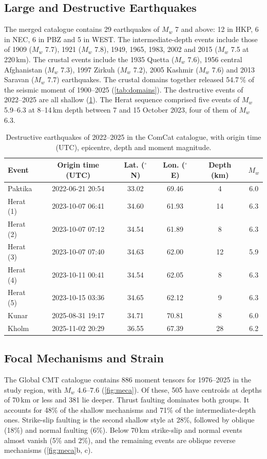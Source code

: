 \documentclass[11pt]{article}
\begin{document}
\subsection{Large and Destructive Earthquakes}
The merged catalogue contains 29 earthquakes of $M_w$ 7 and above: 12 in HKP, 6 in
NEC, 6 in PBZ and 5 in WEST. The intermediate-depth events include those of 1909
($M_w$ 7.7), 1921 ($M_w$ 7.8), 1949, 1965, 1983, 2002 and 2015 ($M_w$ 7.5 at
220\,km). The crustal events include the 1935 Quetta ($M_w$ 7.6), 1956 central
Afghanistan ($M_w$ 7.3), 1997 Zirkuh ($M_w$ 7.2), 2005 Kashmir ($M_w$ 7.6) and 2013
Saravan ($M_w$ 7.7) earthquakes. The crustal domains together released 54.7\,\% of
the seismic moment of 1900--2025 (\cref{tab:domains}). The destructive events of
2022--2025 are all shallow (\cref{tab:events}). The Herat sequence comprised five
events of $M_w$ 5.9--6.3 at 8--14\,km depth between 7 and 15 October 2023, four of
them of $M_w$ 6.3.

\begin{table}[htbp]\centering
  \caption{Destructive earthquakes of 2022--2025 in the ComCat catalogue, with
  origin time (UTC), epicentre, depth and moment magnitude.}
  \label{tab:events}
  \small
  \begin{tabular}{lccccc}
    \toprule
    Event & Origin time (UTC) & Lat. ($^\circ$N) & Lon. ($^\circ$E) & Depth (km) & $M_w$ \\
    \midrule
    Paktika & 2022-06-21 20:54 & 33.02 & 69.46 & 4 & 6.0 \\
    Herat (1) & 2023-10-07 06:41 & 34.60 & 61.93 & 14 & 6.3 \\
    Herat (2) & 2023-10-07 07:12 & 34.54 & 61.89 & 8 & 6.3 \\
    Herat (3) & 2023-10-07 07:40 & 34.63 & 62.00 & 12 & 5.9 \\
    Herat (4) & 2023-10-11 00:41 & 34.54 & 62.05 & 8 & 6.3 \\
    Herat (5) & 2023-10-15 03:36 & 34.65 & 62.12 & 9 & 6.3 \\
    Kunar & 2025-08-31 19:17 & 34.71 & 70.81 & 8 & 6.0 \\
    Kholm & 2025-11-02 20:29 & 36.55 & 67.39 & 28 & 6.2 \\
    \bottomrule
  \end{tabular}
\end{table}

\subsection{Focal Mechanisms and Strain}
The Global CMT catalogue contains 886 moment tensors for 1976--2025 in the study
region, with $M_w$ 4.6--7.6 (\cref{fig:meca}). Of these, 505 have centroids at depths of
70\,km or less and 381 lie deeper. Thrust faulting dominates both groups. It accounts
for 48\% of the shallow mechanisms and 71\% of the intermediate-depth ones. Strike-slip
faulting is the second shallow style at 28\%, followed by oblique (18\%) and normal
faulting (6\%). Below 70\,km strike-slip and normal events almost vanish (5\% and 2\%),
and the remaining events are oblique reverse mechanisms (\cref{fig:meca}b, c).
\end{document}
